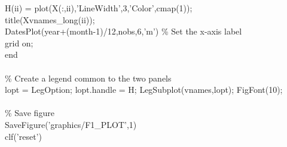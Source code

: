 \hspace{1mm}\hspace{5mm} \hspace{5mm} H(ii) = plot(X(:,ii),\textcolor{matlabpurple}{'LineWidth'},3,\textcolor{matlabpurple}{'Color'},cmap(1)); \\ 
\hspace{1mm}\hspace{5mm} \hspace{5mm} title(Xvnames\_long(ii));  \\ 
\hspace{1mm}\hspace{5mm} \hspace{5mm} DatesPlot(year+(month-1)/12,nobs,6,\textcolor{matlabpurple}{'m'}) \textcolor{matlabgreen}{\% Set the x-axis label  }\\ 
\hspace{1mm}\hspace{5mm} \hspace{5mm} grid on;  \\ 
\hspace{1mm}\hspace{5mm} \textcolor{matlabblue}{end} \\ 
\hspace{1mm}\hspace{5mm}  \\ 
\hspace{1mm}\hspace{5mm} \textcolor{matlabgreen}{\% Create a legend common to the two panels }\\ 
\hspace{1mm}\hspace{5mm} lopt = LegOption; lopt.handle = H; LegSubplot(vnames,lopt); FigFont(10); \\ 
\hspace{1mm}\hspace{5mm}  \\ 
\hspace{1mm}\hspace{5mm} \textcolor{matlabgreen}{\% Save figure }\\ 
\hspace{1mm}\hspace{5mm} SaveFigure(\textcolor{matlabpurple}{'graphics/F1\_PLOT'},1) \\ 
\hspace{1mm}\hspace{5mm} clf(\textcolor{matlabpurple}{'reset'}) \\ 
\hspace{1mm}\hspace{5mm}  \\ 
